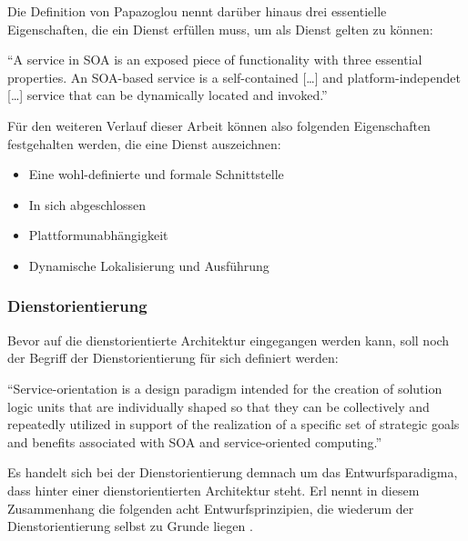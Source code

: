   Die Definition von Papazoglou nennt darüber hinaus drei essentielle Eigenschaften, die ein Dienst erfüllen muss, um als Dienst gelten zu können:

\begin{definition}\label{def:dienst_papazoglou_}
  "`A service in SOA is an exposed piece of functionality with three essential properties. An SOA-based service is a self-contained [\ldots] and platform-independet [\ldots] service that can be dynamically located and invoked."' \emph{\citep[S. 258]{web_services_principles_and_technology}}
\end{definition}

  Für den weiteren Verlauf dieser Arbeit können also folgenden Eigenschaften festgehalten werden, die eine Dienst auszeichnen:
  
  \begin{itemize}
    \item Eine wohl-definierte und formale Schnittstelle
    \item In sich abgeschlossen
    \item Plattformunabhängigkeit
    \item Dynamische Lokalisierung und Ausführung
  \end{itemize}


\subsubsection{Dienstorientierung} %
\label{ssub:definition_dienstorientierung}

  Bevor auf die dienstorientierte Architektur eingegangen werden kann, soll noch der Begriff der Dienstorientierung für sich definiert werden:

\begin{definition}[Dienstorientierung]\label{def:dienstorientierung}
  "`Service-orientation is a design paradigm intended for the creation of solution logic units that are individually shaped so that they can be collectively and repeatedly utilized in support of the realization of a specific set of strategic goals and benefits associated with SOA and service-oriented computing."' \emph{\citep{erl2008soa}}
\end{definition}

  Es handelt sich bei der Dienstorientierung demnach um das Entwurfsparadigma, dass hinter einer dienstorientierten Architektur steht. Erl nennt in diesem Zusammenhang die folgenden acht Entwurfsprinzipien, die wiederum der Dienstorientierung selbst zu Grunde liegen \citep{erl2008soa}.

